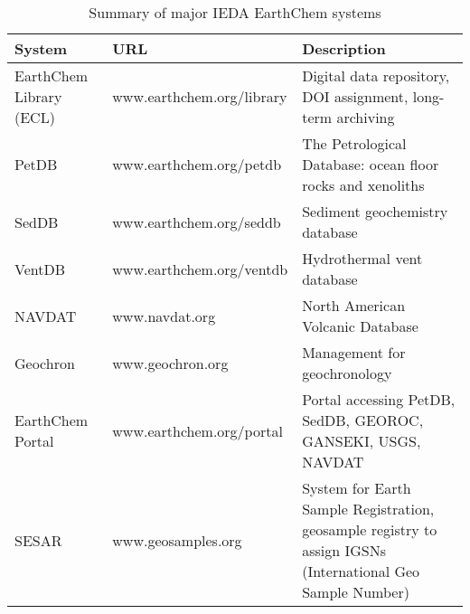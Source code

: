 \begin{table}[p]											
\caption{Summary of major IEDA EarthChem systems}
\begin{tabular}{|l|l|l|}											
\hline											
System	&	URL	&	Description	 \\	
\hline											
\hline	
EarthChem Library (ECL)	&	www.earthchem.org/library	&	Digital data repository, DOI assignment, long-term archiving			\\
PetDB	&	www.earthchem.org/petdb	&	The Petrological Database: ocean floor rocks and xenoliths			\\
SedDB	&	www.earthchem.org/seddb	&	Sediment geochemistry database				\\
VentDB	&	www.earthchem.org/ventdb	&	Hydrothermal vent database			\\
NAVDAT	&	www.navdat.org 	&	North American Volcanic Database				\\
Geochron	&	www.geochron.org	&	Management for geochronology				\\
EarthChem Portal	&	www.earthchem.org/portal	&	Portal accessing PetDB, SedDB, GEOROC, GANSEKI, USGS, NAVDAT			\\
SESAR	&	www.geosamples.org	&	System for Earth Sample Registration, geosample registry to assign IGSNs (International Geo Sample Number)		\\
\hline											
\end{tabular}											
										
\end{table}
